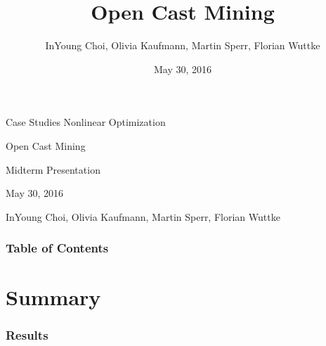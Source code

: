 \documentclass{beamer}
\title[Kurzform]{Open Cast Mining}
\author{InYoung Choi, Olivia Kaufmann, Martin Sperr, Florian Wuttke}
\date{May 30, 2016}
\begin{document}

\begin{frame}[c]
	\begin{center}
		\large{Case Studies Nonlinear Optimization}
	\end{center}
	\vspace{0.5cm}
	\begin{center}
		\Huge{\textcolor{TUMblau2}{Open Cast Mining}}
	\end{center}
	\begin{center}
		\large{Midterm Presentation}
	\end{center}
	\vspace{0.5cm}
	\begin{center}
		May 30, 2016
	\end{center}
	\vspace{0.5cm}
	\begin{center}
		\small{InYoung Choi, Olivia Kaufmann, Martin Sperr, Florian Wuttke}
	\end{center}
\end{frame}

\begin{frame}[c]
	\frametitle{Table of Contents}
	\tableofcontents
\end{frame}

%



%

%


\section{Summary}

\begin{frame}[c]
\frametitle{Results}
\end{frame}
\end{document}

